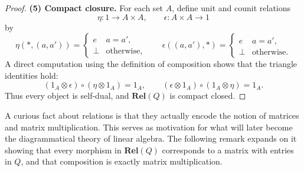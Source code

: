 \begin{proof}
	\medskip
	\noindent
	\textbf{(5) Compact closure.}
	For each set $A$, define unit and counit relations
	\[
		\eta : 1 \to A\times A,
		\qquad
		\epsilon : A\times A \to 1
	\]
	by
	\[
		\eta(*,(a,a')) =
		\begin{cases}
			e    & a=a',             \\
			\bot & \text{otherwise},
		\end{cases}
		\qquad
		\epsilon((a,a'),*) =
		\begin{cases}
			e    & a=a',             \\
			\bot & \text{otherwise}.
		\end{cases}
	\]
	A direct computation using the definition of composition shows that the
	triangle identities hold:
	\[
		(1_A\otimes \epsilon)\circ (\eta\otimes 1_A) = 1_A,
		\qquad
		(\epsilon\otimes 1_A)\circ (1_A\otimes \eta) = 1_A.
	\]
	Thus every object is self-dual, and $\mathbf{Rel}(Q)$ is compact closed.
\end{proof}

A curious fact about relations is that they actually encode the notion of matrices and matrix multiplication. This serves as motivation for what will later become the diagrammatical theory of linear algebra. The following remark expands on it showing that every morphism in \textbf{Rel}$(Q)$ corresponds to a matrix with entries in $Q$, and that composition is exactly matrix multiplication.

